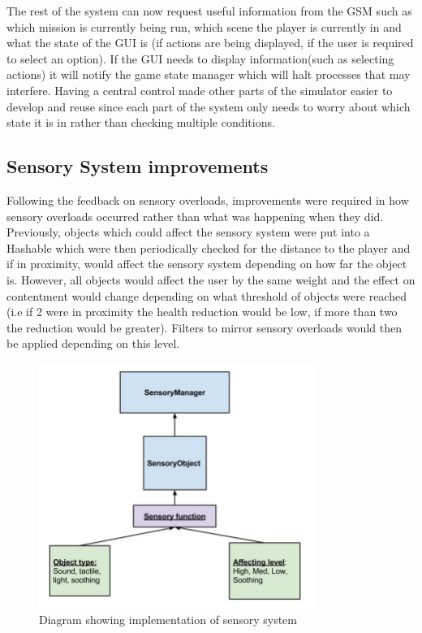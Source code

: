 The rest of the system can now request useful information from the GSM such as which mission is currently being run, which scene the player is currently in and what the state of the GUI is (if actions are being displayed, if the user is required to select an option). If the GUI needs to display information(such as selecting actions) it will notify the game state manager which will halt processes that may interfere. Having a central control made other parts of the simulator easier to develop and reuse since each part of the system only needs to worry about which state it is in rather than checking multiple conditions.

\subsection{Sensory System improvements}
Following the feedback on sensory overloads, improvements were required in how sensory overloads occurred rather than what was happening when they did. Previously, objects which could affect the sensory system were put into a Hashable which were then periodically checked for the distance to the player and if in proximity, would affect the sensory system depending on how far the object is. However, all objects would affect the user by the same weight and the effect on contentment would change depending on what threshold of objects were reached (i.e if 2 were in proximity the health reduction would be low, if more than two the reduction would be greater). Filters to mirror sensory overloads would then be applied depending on this level.

\begin{figure}[H]
\centering
\includegraphics[width=90mm]{images/sensoryobjects.jpg}
\caption{Diagram showing implementation of sensory system}
\label{sensorysystem}
\end{figure}

